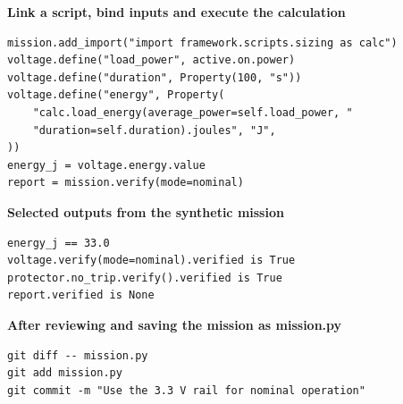 \documentclass[border=5pt]{standalone}
\begin{document}
\begin{minipage}{510pt}
\fontsize{10}{12}\selectfont
\begin{minipage}[t]{506pt}
\vspace{0pt}\textbf{Link a script, bind inputs and execute the calculation}\par\smallskip
\begin{lstlisting}[style=report-python,basicstyle=\ttfamily\fontsize{8.5}{10.88}\selectfont]
mission.add_import("import framework.scripts.sizing as calc")
voltage.define("load_power", active.on.power)
voltage.define("duration", Property(100, "s"))
voltage.define("energy", Property(
    "calc.load_energy(average_power=self.load_power, "
    "duration=self.duration).joules", "J",
))
energy_j = voltage.energy.value
report = mission.verify(mode=nominal)
\end{lstlisting}
\end{minipage}\par\medskip\begin{minipage}[t]{506pt}
\vspace{0pt}\textbf{Selected outputs from the synthetic mission}\par\smallskip
\begin{lstlisting}[style=report-python,basicstyle=\ttfamily\fontsize{8.5}{10.88}\selectfont]
energy_j == 33.0
voltage.verify(mode=nominal).verified is True
protector.no_trip.verify().verified is True
report.verified is None
\end{lstlisting}
\end{minipage}\par\medskip\begin{minipage}[t]{506pt}
\vspace{0pt}\textbf{After reviewing and saving the mission as mission.py}\par\smallskip
\begin{lstlisting}[style=report-bash,basicstyle=\ttfamily\fontsize{8.5}{10.88}\selectfont]
git diff -- mission.py
git add mission.py
git commit -m "Use the 3.3 V rail for nominal operation"
\end{lstlisting}
\end{minipage}
\end{minipage}
\end{document}
